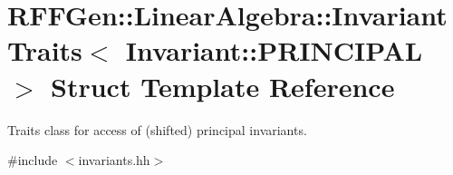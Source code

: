 \hypertarget{structRFFGen_1_1LinearAlgebra_1_1InvariantTraits_3_01Invariant_1_1PRINCIPAL_01_4}{\section{R\-F\-F\-Gen\-:\-:Linear\-Algebra\-:\-:Invariant\-Traits$<$ Invariant\-:\-:P\-R\-I\-N\-C\-I\-P\-A\-L $>$ Struct Template Reference}
\label{structRFFGen_1_1LinearAlgebra_1_1InvariantTraits_3_01Invariant_1_1PRINCIPAL_01_4}
}


Traits class for access of (shifted) principal invariants.  




{\ttfamily \#include $<$invariants.\-hh$>$}

